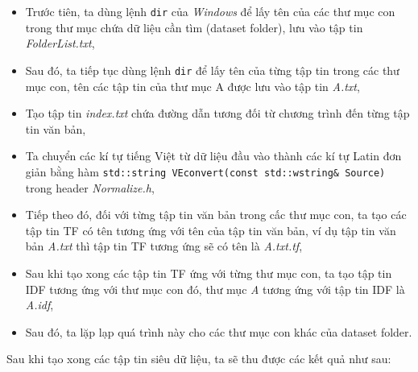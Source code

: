 \documentclass[12pt,a4paper]{article}
\begin{document}
\begin{itemize}
\item Trước tiên, ta dùng lệnh \lstinline{dir} của \textit{Windows} để lấy tên của các thư mục con trong thư mục chứa dữ liệu cần tìm (dataset folder), lưu vào tập tin \textit{FolderList.txt},
\item Sau đó, ta tiếp tục dùng lệnh \lstinline{dir} để lấy tên của từng tập tin trong các thư mục con, tên các tập tin của thư mục A được lưu vào tập tin \textit{A.txt}, 
\item Tạo tập tin \textit{index.txt} chứa đường dẫn tương đối từ chương trình đến từng tập tin văn bản,
\item Ta chuyển các kí tự tiếng Việt từ dữ liệu đầu vào thành các kí tự Latin đơn giản bằng hàm \lstinline{std::string VEconvert(const std::wstring& Source)} trong header \textit{Normalize.h},
\item Tiếp theo đó, đối với từng tập tin văn bản trong cấc thư mục con, ta tạo các tập tin TF có tên tương ứng với tên của tập tin văn bản, ví dụ tập tin văn bản \textit{A.txt} thì tập tin TF tương ứng sẽ có tên là \textit{A.txt.tf},
\item Sau khi tạo xong các tập tin TF ứng với từng thư mục con, ta tạo tập tin IDF tương ứng với thư mục con đó, thư mục \textit{A} tương ứng với tập tin IDF là \textit{A.idf},
\item Sau đó, ta lặp lạp quá trình này cho các thư mục con khác của dataset folder.
\end{itemize}
Sau khi tạo xong các tập tin siêu dữ liệu, ta sẽ thu được các kết quả như sau:
\end{document}
